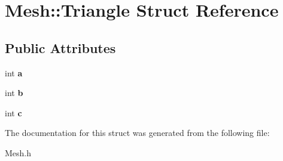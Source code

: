 \hypertarget{struct_mesh_1_1_triangle}{
\section{Mesh::Triangle Struct Reference}
\label{struct_mesh_1_1_triangle}
}
\subsection*{Public Attributes}
\begin{DoxyCompactItemize}
\item 
\hypertarget{struct_mesh_1_1_triangle_add060944a2379d2c9e6fa1bf481d21dc}{
int {\bfseries a}}
\label{struct_mesh_1_1_triangle_add060944a2379d2c9e6fa1bf481d21dc}

\item 
\hypertarget{struct_mesh_1_1_triangle_ad1afcb079110dd40549f61cb47503907}{
int {\bfseries b}}
\label{struct_mesh_1_1_triangle_ad1afcb079110dd40549f61cb47503907}

\item 
\hypertarget{struct_mesh_1_1_triangle_ad6ae3704db73a0323fdc7a78b9b6a026}{
int {\bfseries c}}
\label{struct_mesh_1_1_triangle_ad6ae3704db73a0323fdc7a78b9b6a026}

\end{DoxyCompactItemize}


The documentation for this struct was generated from the following file:\begin{DoxyCompactItemize}
\item 
Mesh.h\end{DoxyCompactItemize}
